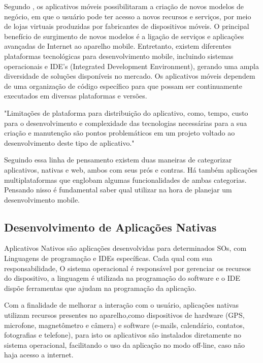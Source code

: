 Segundo , os aplicativos móveis possibilitaram a criação de novos modelos de negócio, em que o usuário pode ter acesso a novos recursos e serviços, por meio de lojas virtuais produzidas por fabricantes de dispositivos móveis. O principal benefício de surgimento de novos modelos é a ligação de serviços e aplicações avançadas de Internet ao aparelho mobile. Entretanto, existem diferentes plataformas tecnológicas para desenvolvimento mobile, incluindo sistemas operacionais e IDE's  (Integrated Development Environment), gerando uma ampla diversidade de soluções disponíveis no mercado. Os aplicativos móveis dependem de uma organização de código específico para que possam ser continuamente executados em diversas plataformas e versões.

\begin{citacao}
	"Limitações de plataforma para distribuição do aplicativo, como, tempo, custo para o desenvolvimento e complexidade das tecnologias necessárias para a sua criação e manutenção são pontos problemáticos em um projeto voltado ao desenvolvimento deste tipo de aplicativo."\cite{emdesafios}
\end{citacao}

Seguindo essa linha de pensamento existem duas maneiras de categorizar
aplicativos, nativas e web, ambos com seus prós e contras. Há também aplicações multiplataformas que englobam algumas funcionalidades de ambas categorias. Pensando nisso é fundamental saber qual utilizar na hora de planejar um desenvolvimento mobile.

\subsection{Desenvolvimento de Aplicações Nativas}

Aplicativos Nativos são aplicações desenvolvidas para determinados SOs, com Linguagens de programação e IDEs específicas. Cada qual com sua responsabilidade, O sistema operacional é responsável por gerenciar os recursos do dispositivo, a linguagem é utilizada na programação do software e o IDE dispõe ferramentas que ajudam na programação da aplicação.

Com a finalidade de melhorar a interação com o usuário, aplicações nativas utilizam recursos presentes no aparelho,como dispositivos de hardware (GPS, microfone, magnetômetro e câmera) e software (e-mails,  calendário, contatos, fotografias e telefone), para isto os aplicativos são instalados diretamente no sistema operacional, facilitando o uso da aplicação no modo off-line, caso não haja acesso a internet.\cite{toledo2016desenvolvimento}

